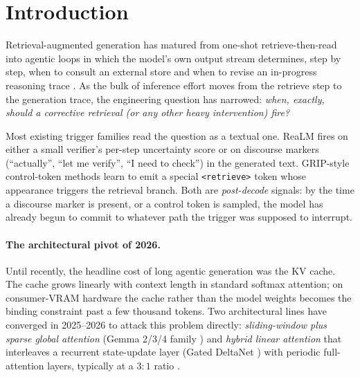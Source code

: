 \documentclass[11pt,letterpaper]{article}
\begin{document}
\begin{abstract}
The paper's evaluation arm — Phase 4 in the engineering record — is
deliberately preregistered here and not yet executed; we describe the
HotpotQA / MuSiQue showdown design and the trigger calibration protocol
as a roadmap, not as evidence.
\end{abstract}

\section{Introduction}
\label{sec:intro}

Retrieval-augmented generation has matured from one-shot retrieve-then-read
\citep{TODO:lewis2020rag} into agentic loops in which the model's own
output stream determines, step by step, when to consult an external store
and when to revise an in-progress reasoning trace
\citep{TODO:CRAG, TODO:SelfRAG, TODO:realm-retrieve, TODO:grip}. As the
bulk of inference effort moves from the retrieve step to the generation
trace, the engineering question has narrowed: \emph{when, exactly, should
a corrective retrieval (or any other heavy intervention) fire?}

Most existing trigger families read the question as a textual one. ReaLM
\citep{TODO:realm-retrieve} fires on either a small verifier's
per-step uncertainty score or on discourse markers (``actually'', ``let
me verify'', ``I need to check'') in the generated text. GRIP-style
control-token methods \citep{TODO:grip} learn to emit a special
\verb|<retrieve>| token whose appearance triggers the retrieval branch.
Both are \emph{post-decode} signals: by the time a discourse marker is
present, or a control token is sampled, the model has already begun to
commit to whatever path the trigger was supposed to interrupt.

\paragraph{The architectural pivot of 2026.}
Until recently, the headline cost of long agentic generation was the
KV cache. The cache grows linearly with context length in standard
softmax attention; on consumer-VRAM hardware the cache rather than the
model weights becomes the binding constraint past a few thousand
tokens. Two architectural lines have converged in 2025–2026 to attack
this problem directly: \emph{sliding-window plus sparse global
attention} (Gemma 2/3/4 family
\citep{TODO:gemma4-card, TODO:gemma2}) and \emph{hybrid linear
attention} that interleaves a recurrent state-update layer (Gated
DeltaNet \citep{TODO:gated-deltanet, TODO:qwen3-next}) with periodic
full-attention layers, typically at a $3{:}1$ ratio
\citep{TODO:raschka-deltanet, TODO:kimi-linear}.
\end{document}
